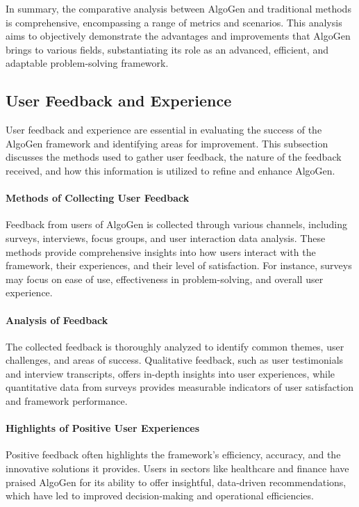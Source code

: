 \documentclass{article}
\begin{document}
In summary, the comparative analysis between AlgoGen and traditional methods is comprehensive, encompassing a range of metrics and scenarios. This analysis aims to objectively demonstrate the advantages and improvements that AlgoGen brings to various fields, substantiating its role as an advanced, efficient, and adaptable problem-solving framework.


\subsection{User Feedback and Experience}
User feedback and experience are essential in evaluating the success of the AlgoGen framework and identifying areas for improvement. This subsection discusses the methods used to gather user feedback, the nature of the feedback received, and how this information is utilized to refine and enhance AlgoGen.

\paragraph{Methods of Collecting User Feedback}
Feedback from users of AlgoGen is collected through various channels, including surveys, interviews, focus groups, and user interaction data analysis. These methods provide comprehensive insights into how users interact with the framework, their experiences, and their level of satisfaction. For instance, surveys may focus on ease of use, effectiveness in problem-solving, and overall user experience.

\paragraph{Analysis of Feedback}
The collected feedback is thoroughly analyzed to identify common themes, user challenges, and areas of success. Qualitative feedback, such as user testimonials and interview transcripts, offers in-depth insights into user experiences, while quantitative data from surveys provides measurable indicators of user satisfaction and framework performance.

\paragraph{Highlights of Positive User Experiences}
Positive feedback often highlights the framework's efficiency, accuracy, and the innovative solutions it provides. Users in sectors like healthcare and finance have praised AlgoGen for its ability to offer insightful, data-driven recommendations, which have led to improved decision-making and operational efficiencies.
\end{document}
